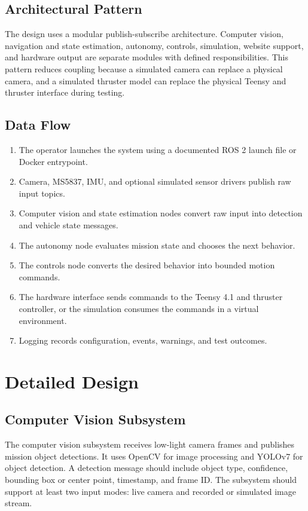 \documentclass[12pt]{article}
\begin{document}
\subsection{Architectural Pattern}
The design uses a modular publish-subscribe architecture. Computer vision, navigation and state estimation, autonomy, controls, simulation, website support, and hardware output are separate modules with defined responsibilities. This pattern reduces coupling because a simulated camera can replace a physical camera, and a simulated thruster model can replace the physical Teensy and thruster interface during testing.

\subsection{Data Flow}
\begin{enumerate}[leftmargin=*]
  \item The operator launches the system using a documented ROS 2 launch file or Docker entrypoint.
  \item Camera, MS5837, IMU, and optional simulated sensor drivers publish raw input topics.
  \item Computer vision and state estimation nodes convert raw input into detection and vehicle state messages.
  \item The autonomy node evaluates mission state and chooses the next behavior.
  \item The controls node converts the desired behavior into bounded motion commands.
  \item The hardware interface sends commands to the Teensy 4.1 and thruster controller, or the simulation consumes the commands in a virtual environment.
  \item Logging records configuration, events, warnings, and test outcomes.
\end{enumerate}

\section{Detailed Design}
\subsection{Computer Vision Subsystem}
The computer vision subsystem receives low-light camera frames and publishes mission object detections. It uses OpenCV for image processing and YOLOv7 for object detection. A detection message should include object type, confidence, bounding box or center point, timestamp, and frame ID. The subsystem should support at least two input modes: live camera and recorded or simulated image stream.
\end{document}
